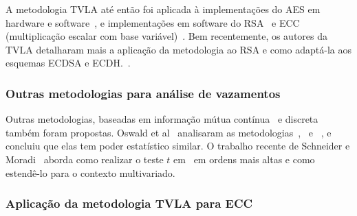 A metodologia TVLA até então foi aplicada à implementações do AES em hardware e software~\cite{Goodwill2011,Cooper2013,MatherOswaldBandenburg2013}, e implementações em software do RSA~\cite{Witteman2011} e ECC (multiplicação escalar com base variável)~\cite{Nascimento2015_Space}. Bem recentemente, os autores da TVLA detalharam mais a aplicação da metodologia ao RSA e como adaptá-la aos esquemas ECDSA e ECDH.~\cite{TunstallGoodwill2016}.

\subsubsection{Outras metodologias para análise de vazamentos}

%
Outras metodologias, baseadas em informação mútua contínua~\cite{Chothia2011} e discreta~\cite{Chatzikokolakis2010} também foram propostas.
%
%
Oswald et al~\cite{MatherOswaldBandenburg2013} analisaram as metodologias~\cite{Goodwill2011},~\cite{Chatzikokolakis2010} e ~\cite{Chothia2011}, e concluiu que elas tem poder estatístico similar.
%
%
O trabalho recente de Schneider e Moradi~\cite{SchneiderM16} aborda como realizar o teste $t$ em~\cite{Goodwill2011} em ordens mais altas e como estendê-lo para o contexto multivariado.
%
\subsubsection{Aplicação da metodologia TVLA para ECC}

